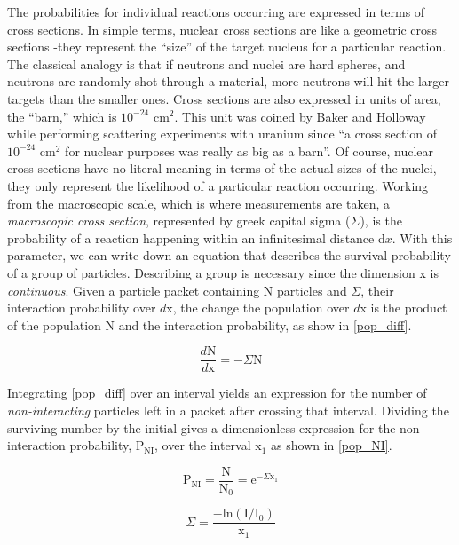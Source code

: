 The probabilities for individual reactions occurring are expressed in terms of cross sections.  In simple terms, nuclear cross sections are like a geometric cross sections -they represent the ``size'' of the target nucleus for a particular reaction.  The classical analogy is that if neutrons and nuclei are hard spheres, and neutrons are randomly shot through a material, more neutrons will hit the larger targets than the smaller ones.  Cross sections are also expressed in units of area, the ``barn,'' which is $10^{-24}$ cm$^2$.  This unit was coined by Baker and Holloway while performing scattering experiments with uranium since ``a cross section of $10^{-24}$ cm$^2$ for nuclear purposes was really as big as a barn''\cite{LAMS523}.  Of course, nuclear cross sections have no literal meaning in terms of the actual sizes of the nuclei, they only represent the likelihood of a particular reaction occurring.  Working from the macroscopic scale, which is where measurements are taken, a \emph{macroscopic cross section}, represented by greek capital sigma ($\Sigma$), is the probability of a reaction happening within an infinitesimal distance d$x$.  With this parameter, we can write down an equation that describes the survival probability of a group of particles.  Describing a group is necessary since the dimension x is \emph{continuous}.  Given a particle packet containing N particles and $\Sigma$, their interaction probability over $d$x, the change the population over $d$x is the product of the population N and the interaction probability, as show in \eqref{pop_diff}.

\begin{equation}
\frac{d\mathrm{N}}{d\mathrm{x}} = - \Sigma \mathrm{N}
\label{pop_diff}
\end{equation}

Integrating \ref{pop_diff} over an interval yields an expression for the number of \emph{non-interacting} particles left in a packet after crossing that interval.  Dividing the surviving number by the initial gives a dimensionless expression for the non-interaction probability, P$_\mathrm{NI}$, over the interval x$_1$ as shown in \eqref{pop_NI}.

\begin{equation}
\mathrm{P}_\mathrm{NI} = \frac{\mathrm{N}}{\mathrm{N}_0} = \mathrm{e}^{- \Sigma \mathrm{x}_1}
\label{pop_NI}
\end{equation}

\begin{equation}
\Sigma = \frac{ - \mathrm{ln}(    \mathrm{I} / \mathrm{I}_0  )  }  {\mathrm{x}_1}
\label{pop_beam}
\end{equation}

